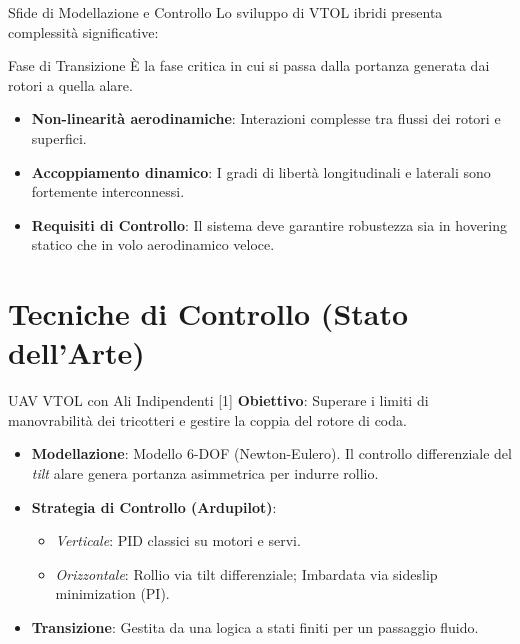 \documentclass[aspectratio=169]{beamer}
\begin{document}
\begin{frame}{Sfide di Modellazione e Controllo}
    Lo sviluppo di VTOL ibridi presenta complessità significative:
    \begin{block}{Fase di Transizione}
        È la fase critica in cui si passa dalla portanza generata dai rotori a quella alare.
    \end{block}
    \begin{itemize}
        \item \textbf{Non-linearità aerodinamiche}: Interazioni complesse tra flussi dei rotori e superfici.
        \item \textbf{Accoppiamento dinamico}: I gradi di libertà longitudinali e laterali sono fortemente interconnessi.
        \item \textbf{Requisiti di Controllo}: Il sistema deve garantire robustezza sia in hovering statico che in volo aerodinamico veloce.
    \end{itemize}
\end{frame}

\section{Tecniche di Controllo (Stato dell'Arte)}

\begin{frame}{UAV VTOL con Ali Indipendenti [1]}
    \textbf{Obiettivo}: Superare i limiti di manovrabilità dei tricotteri e gestire la coppia del rotore di coda.
    \vspace{0.3cm}
    \begin{itemize}
        \item \textbf{Modellazione}: Modello 6-DOF (Newton-Eulero). Il controllo differenziale del \textit{tilt} alare genera portanza asimmetrica per indurre rollio.
        \item \textbf{Strategia di Controllo (Ardupilot)}:
        \begin{itemize}
            \item \textit{Verticale}: PID classici su motori e servi.
            \item \textit{Orizzontale}: Rollio via tilt differenziale; Imbardata via sideslip minimization (PI).
        \end{itemize}
        \item \textbf{Transizione}: Gestita da una logica a stati finiti per un passaggio fluido.
    \end{itemize}
\end{frame}
\end{document}
